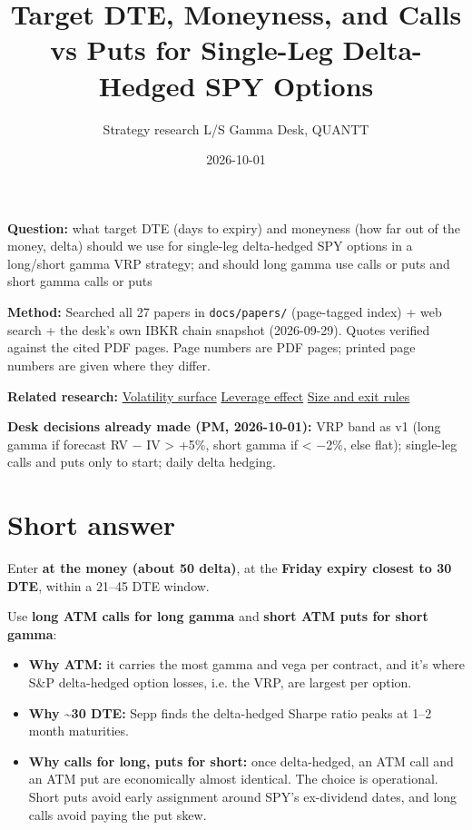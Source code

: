 \documentclass{article}
\title{Target DTE, Moneyness, and Calls vs Puts for Single-Leg Delta-Hedged SPY Options}
\author{Strategy research \textperiodcentered{} L/S Gamma Desk, QUANTT}
\date{2026-10-01}
\begin{document}
\maketitle

\textbf{Question:} what target DTE (days to expiry) and moneyness (how far out of the money, delta) should we use for single-leg delta-hedged SPY options in a long/\allowbreak{}short gamma VRP strategy; and should long gamma use calls or puts and short gamma calls or puts

\textbf{Method:} Searched all 27 papers in \texttt{docs/\allowbreak{}papers/\allowbreak{}} (page-tagged index) + web search + the desk's own IBKR chain snapshot (2026-09-29). Quotes verified against the cited PDF pages. Page numbers are PDF pages; printed page numbers are given where they differ.

\textbf{Related research:} \href{2026-09-27-volatility-surface-for-the-strategy.pdf}{Volatility surface} \textperiodcentered{} \href{2026-09-27-leverage-effect-and-the-ls-gamma-desk.pdf}{Leverage effect} \textperiodcentered{} \href{2026-10-01-position-size-and-exit-rules.pdf}{Size and exit rules}

\textbf{Desk decisions already made (PM, 2026-10-01):} VRP band as v1 (long gamma if forecast RV \ensuremath{-} IV > +5\%, short gamma if < \ensuremath{-}2\%, else flat); single-leg calls and puts only to start; daily delta hedging.

\section{Short answer}

Enter \textbf{at the money (about 50 delta)}, at the \textbf{Friday expiry closest to 30 DTE}, within a 21--45 DTE window.

Use \textbf{long ATM calls for long gamma} and \textbf{short ATM puts for short gamma}:

\begin{itemize}

\item \textbf{Why ATM:} it carries the most gamma and vega per contract, and it's where S\&P delta-hedged option losses, i.e. the VRP, are largest per option.

\item \textbf{Why \textasciitilde{}30 DTE:} Sepp finds the delta-hedged Sharpe ratio peaks at 1--2 month maturities.

\item \textbf{Why calls for long, puts for short:} once delta-hedged, an ATM call and an ATM put are economically almost identical. The choice is operational. Short puts avoid early assignment around SPY's ex-dividend dates, and long calls avoid paying the put skew.

\end{itemize}
\end{document}
